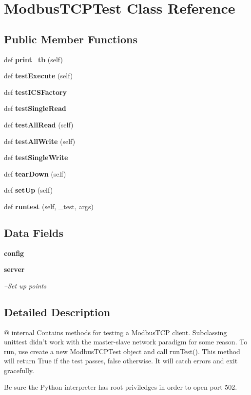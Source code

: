 \section{Modbus\+T\+C\+P\+Test Class Reference}
\label{classprotolibs_1_1ics__clients_1_1_modbus_t_c_p_test}
\subsection*{Public Member Functions}
\begin{DoxyCompactItemize}
\item 
def {\bf print\+\_\+tb} (self)
\item 
def {\bf test\+Execute} (self)
\item 
def {\bf test\+I\+C\+S\+Factory}
\item 
def {\bf test\+Single\+Read}
\item 
def {\bf test\+All\+Read} (self)
\item 
def {\bf test\+All\+Write} (self)
\item 
def {\bf test\+Single\+Write}
\item 
def {\bf tear\+Down} (self)
\item 
def {\bf set\+Up} (self)
\item 
def {\bf runtest} (self, \+\_\+test, args)
\end{DoxyCompactItemize}
\subsection*{Data Fields}
\begin{DoxyCompactItemize}
\item 
{\bf config}
\item 
{\bf server}
\begin{DoxyCompactList}\small\item\em --Set up points \end{DoxyCompactList}\end{DoxyCompactItemize}


\subsection{Detailed Description}
\begin{DoxyVerb}@ internal
   Contains methods for testing a ModbusTCP client. Subclassing unittest 
        didn't work  with the master-slave network paradigm for some reason.
    To run, use create a new ModbusTCPTest object and call runTest(). This
    method will return True if the test passes, false otherwise. It will
    catch errors and exit gracefully. 
    
    Be sure the Python interpreter has root priviledges in order to open
    port 502.
\end{DoxyVerb}
 

